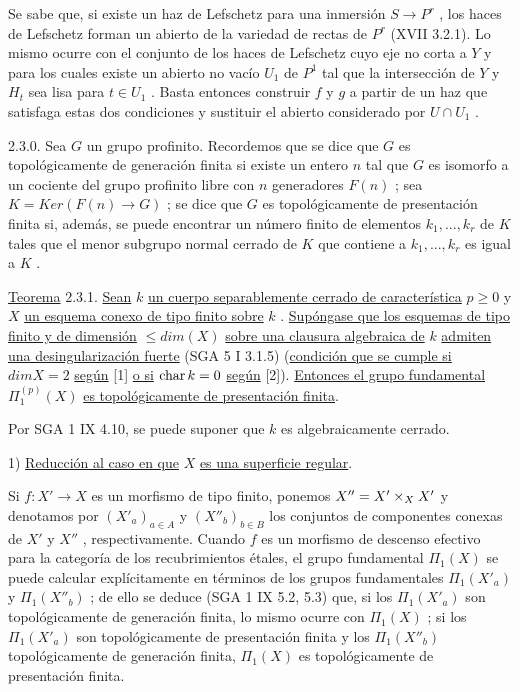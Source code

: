 Se sabe que, si existe un haz de Lefschetz para una inmersión $S \longrightarrow P^r$ , los haces de Lefschetz forman un abierto de la variedad de rectas de $P^r$ (XVII 3.2.1). Lo mismo ocurre con el conjunto de los haces de Lefschetz cuyo eje no corta a $Y$ y para los cuales existe un abierto no vacío $U_1$ de $P^1$ tal que la intersección de $Y$ y $H_t$ sea lisa para $t \in U_1$ . Basta entonces construir $f$ y $g$ a partir de un haz que satisfaga estas dos condiciones y sustituir el abierto considerado por $U \cap U_1$ .

2.3.0. Sea $G$ un grupo profinito. Recordemos que se dice que $G$ es topológicamente de generación finita si existe un entero $n$ tal que $G$ es isomorfo a un cociente del grupo profinito libre con $n$ generadores $F(n)$ ; sea $K = Ker(F(n) \longrightarrow G)$ ; se dice que $G$ es topológicamente de presentación finita si, además, se puede encontrar un número finito de elementos $k_1,...,k_r$ de $K$ tales que el menor subgrupo normal cerrado de $K$ que contiene a $k_1,...,k_r$ es igual a $K$ .

\underline{Teorema} 2.3.1. \underline{Sean} $k$ \underline{un cuerpo separablemente cerrado de característica} $p \geqslant 0$  y $X$ \underline{un esquema conexo de tipo finito sobre} $k$ . \underline{Supóngase que los esquemas de tipo finito y de dimensión} $\leqslant dim(X)$ \underline{sobre una clausura algebraica de} $k$ \underline{admiten una desingularización fuerte} (SGA 5 I 3.1.5) (\underline{condición que se cumple si} $dim X = 2$ \underline{según} [1] \underline{o si} $\sisi{k}{\operatorname{char}k} = 0$ \underline{según} [2]). \underline{Entonces el grupo fundamental} $\Pi_1^{(p)}(X)$ \underline{es topológicamente de presentación finita}.

Por SGA 1 IX 4.10, se puede suponer que $k$ es algebraicamente cerrado.


1) \underline{Reducción al caso en que} $X$ \underline{es una superficie regular}.

Si $f : X' \longrightarrow X$ es un morfismo de tipo finito, ponemos $X'' = X'\times_X \sisi{S'}{X'}$ y denotamos por $(X'_a)_{a \in A}$ y $(X''_b)_{b \in B}$ los conjuntos de componentes conexas de $X'$ y $X''$ , respectivamente. Cuando $f$ es un morfismo de descenso efectivo para la categoría de los recubrimientos étales, el grupo fundamental $\Pi_1(X)$ se puede calcular explícitamente
en términos de los grupos fundamentales $\Pi_1(X'_a)$ y $\Pi_1(X''_b)$ ; de ello se deduce (SGA 1 IX 5.2, 5.3) que, si los $\Pi_1(X'_a)$ son topológicamente de generación finita, lo mismo ocurre con $\Pi_1(X)$ ; si los $\Pi_1(X'_a)$ son topológicamente de presentación finita y los $\Pi_1(X''_b)$ topológicamente de generación finita, $\Pi_1(X)$ es topológicamente de presentación finita.

